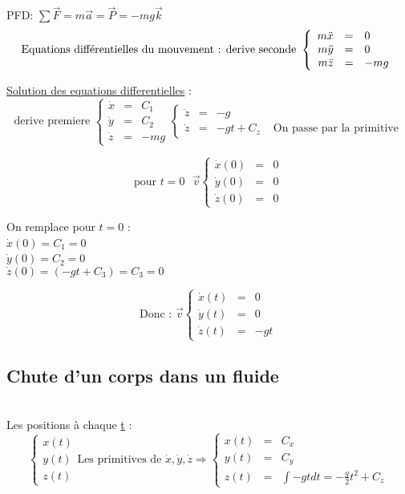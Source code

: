 PFD: $\sum\vec{F} = m\vec{a} = \vec{P} = -mg\vec{k} $
\[ \text{Equations différentielles du mouvement : ~\\
	derive seconde }\left\{ \begin{array}{rcl}
	m\ddot{x} &=& 0 \\
	m\ddot{y} &=& 0 \\
m\ddot{z} &=& -mg \end{array} \right. \]

\ul{Solution des equations differentielles} : ~\\
\[\text{derive premiere } \left\{ \begin{array}{rcl}
			\dot{x} &=&C_1 \\
			\dot{y} &=&C_2 \\
			\dot{z} &=& -mg
		\end{array}\right. \left\{\begin{array}{rclr}
			\ddot{z} &=& -g \\
		\dot{z} &=& -gt + C_z & \text{ On passe par la primitive} \end{array}\right.
\]

\[\text{pour } t=0 \text{ } \vec{v} \left\{ \begin{array}{rcl}
			\dot{x}(0) &=&0 \\
			\dot{y}(0) &=&0 \\
	\dot{z}(0) &=&0 \end{array}\right.\] 

			On remplace pour $t=0$ : ~\\
			$\dot{x}(0) = C_1 = 0$ ~\\
			$\dot{y}(0) = C_2 = 0$ ~\\
			$\dot{z}(0) = (-gt+C_3) = C_3 = 0$
			
			\[\text{Donc : } \vec{v} \left\{ \begin{array}{rcl} 
			\dot{x}(t) &=&0 \\
			\dot{y}(t) &=&0 \\
			\dot{z}(t) &=& -gt \end{array} \right. \]

\subsection{Chute d'un corps dans un fluide} ~\\
Les positions à chaque \ul{t} : \[\left\{ \begin{array}{r}
			x(t) \\
			y(t) \\
		z(t) \end{array} \right.
		\text{Les primitives de } \dot{x}, \dot{y}, \dot{z} \Rightarrow \left\{ \begin{array}{rcl}
			x(t) &=& C_x \\
			y(t) &=& C_y \\
			z(t) &=& \int{-gt dt} = -\frac{g}{2}t^2 + C_z \end{array} \right. \]

